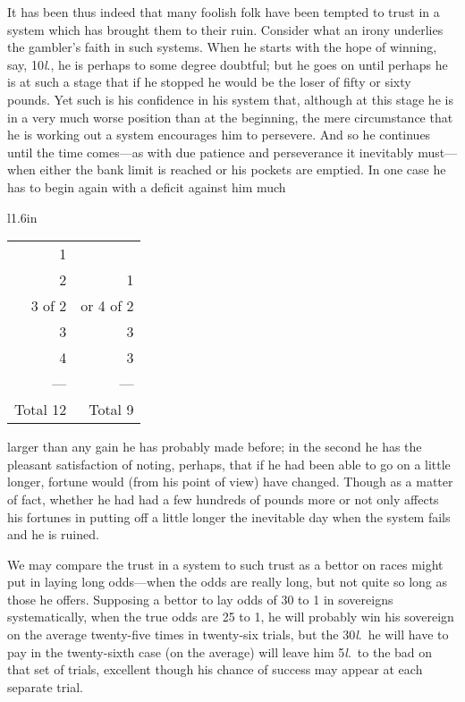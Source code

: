 \documentclass[letterpaper,12pt,oneside,openany]{memoir}
\begin{document}
It has been thus indeed that many foolish folk have
been tempted to trust in a system which has brought
them to their ruin. Consider what an irony underlies
the gambler's faith in such systems. When he starts
with the hope of winning, say, 10\textit{l}., he is perhaps to
some degree doubtful; but he goes on until perhaps he
is at such a stage that if he stopped he would be the
loser of fifty or sixty pounds. Yet such is his confidence
in his system that, although at this stage he is in
a very much worse position than at the beginning, the
mere circumstance that he is working out a system
encourages him to persevere. And so he continues
until the time comes---as with due patience and perseverance
it inevitably must---when either the bank limit
is reached or his pockets are emptied. In one case he
has to begin again with a deficit against him much
\begin{wrapfigure}[9]{l}{1.6in}
    \begin{tabular}{rr}
           1 &           \\
           2 &         1 \\
      3 of 2 & or 4 of 2 \\
           3 &         3 \\
           4 &         3 \\
         --- &       --- \\
    Total 12 &   Total 9
    \end{tabular}
\end{wrapfigure}
larger than any gain he has probably made before; in
the second he has the pleasant satisfaction of noting,
perhaps, that if he had been able to go on a little longer,
fortune would (from his point of view) have changed.
Though as a matter of fact, whether he had had a few
hundreds of pounds more or not only affects his fortunes
in putting off a little longer the inevitable day when
the system fails and he is ruined.

We may compare the trust in a system to such trust
as a bettor on races might put in laying long odds---when
the odds are really long, but not quite so long as
those he offers. Supposing a bettor to lay odds of 30
to 1 in sovereigns systematically, when the true odds
are 25 to 1, he will probably win his sovereign on the
average twenty-five times in twenty-six trials, but the
30\textit{l}.\ he will have to pay in the twenty-sixth case (on the
average) will leave him 5\textit{l}.\ to the bad on that set of
trials, excellent though his chance of success may
appear at each separate trial.
\end{document}
